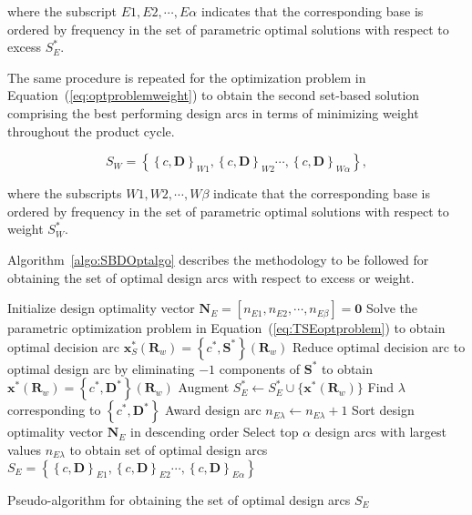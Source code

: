 where the subscript $E1,E2,\cdots,E\alpha$ indicates that the corresponding base is ordered by frequency in the set of parametric optimal solutions with respect to excess $S_E^*$.

The same procedure is repeated for the optimization problem in Equation~(\ref{eq:optproblemweight}) to obtain the second set-based solution comprising the best performing design arcs in terms of minimizing weight throughout the product cycle.

\begin{equation} \label{eq:SBDweight}
	S_W = \left\{\left\{c,\mathbf{D}\right\}_{W1},\left\{c,\mathbf{D}\right\}_{W2}\cdots,\left\{c,\mathbf{D}\right\}_{W\alpha}\right\},
\end{equation}

where the subscripts $W1,W2,\cdots,W\beta$ indicate that the corresponding base is ordered by frequency in the set of parametric optimal solutions with respect to weight $S_W^*$.

Algorithm~\ref{algo:SBDOptalgo} describes the methodology to be followed for obtaining the set of optimal design arcs with respect to excess or weight.

\begin{algorithm}
	\DontPrintSemicolon %
	Initialize design optimality vector $\mathbf{N}_E = \left[n_{E1},n_{E2},\cdots,n_{E\beta}\right] = \mathbf{0}$\;	
	 {
		Solve the parametric optimization problem in Equation~(\ref{eq:TSEoptproblem}) to obtain optimal decision arc $\mathbf{x}_S^*(\mathbf{R}_w) = \left\{c^*,\mathbf{S}^*\right\}(\mathbf{R}_w)$\;
		Reduce optimal decision arc to optimal design arc by eliminating $-1$ components of $\mathbf{S}^*$ to obtain $\mathbf{x}^*(\mathbf{R}_w) = \left\{c^*,\mathbf{D}^*\right\}(\mathbf{R}_w)$\;
		Augment $S_{E}^* \gets S_{E}^* \cup \{ \mathbf{x}^*(\mathbf{R}_w) \} $\;
		Find $\lambda$ corresponding to $\left\{c^*,\mathbf{D}^*\right\}$\;
		Award design arc $n_{E\lambda} \gets n_{E\lambda} + 1$\;
	}
	Sort design optimality vector $\mathbf{N}_E$ in descending order\;
	Select top $\alpha$ design arcs with largest values $n_{E\lambda}$ to obtain set of optimal design arcs $S_E = \left\{\left\{c,\mathbf{D}\right\}_{E1},\left\{c,\mathbf{D}\right\}_{E2}\cdots,\left\{c,\mathbf{D}\right\}_{E\alpha}\right\}$\;
	\caption{Pseudo-algorithm for obtaining the set of optimal design arcs $S_{E}$}
	\label{algo:SBDOptalgo}
\end{algorithm}

